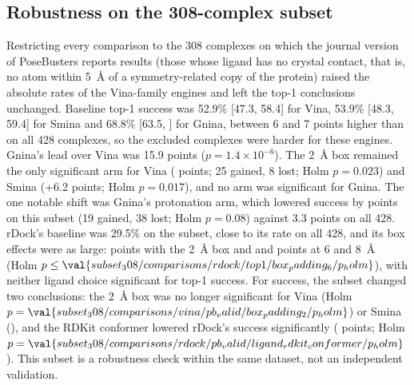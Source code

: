 \subsection{Robustness on the 308-complex subset}

Restricting every comparison to the 308 complexes on which the journal version of
PoseBusters reports results (those whose ligand has no crystal contact, that is, no atom
within \SI{5}{\angstrom} of a symmetry-related copy of the protein)
raised the absolute rates of the Vina-family engines and left the top-1 conclusions
unchanged. Baseline top-1 success was
52.9\% [47.3, 58.4] for Vina, 53.9\% [48.3, 59.4] for Smina and 68.8\% [63.5, ] for
Gnina, between 6 and 7 points higher than on all 428 complexes, so the excluded complexes
were harder for these engines. Gnina's lead over Vina was 15.9 points
($p = 1.4 \times 10^{-6}$). The \SI{2}{\angstrom} box remained the only significant arm
for Vina ( points; 25 gained, 8 lost; Holm $p = 0.023$) and Smina (+6.2 points; Holm
$p = 0.017$), and no arm was significant for Gnina. The one notable shift was Gnina's
protonation arm, which lowered success by  points on this subset (19 gained, 38 lost;
Holm $p = 0.08$) against 3.3 points on all 428. rDock's baseline was 29.5\% on the
subset, close to its rate on all 428, and its box effects were as large:  points with
the \SI{2}{\angstrom} box and  and  points at 6 and \SI{8}{\angstrom} (Holm
$p \le \val{subset_308/comparisons/rdock/top1/box_padding_6/p_holm}$), with neither ligand choice significant for top-1 success.
For \pbvalid{} success, the subset changed two conclusions: the \SI{2}{\angstrom} box was no
longer significant for Vina (Holm $p = \val{subset_308/comparisons/vina/pb_valid/box_padding_2/p_holm}$) or Smina (), and the RDKit conformer
lowered rDock's \pbvalid{} success significantly ( points; Holm $p = \val{subset_308/comparisons/rdock/pb_valid/ligand_rdkit_conformer/p_holm}$).
This subset is a robustness check within the same dataset, not an independent validation.

